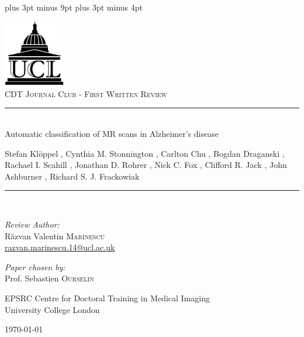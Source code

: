 \documentclass[11pt,a4paper,oneside]{report}
\begin{document}
\belowdisplayskip=12pt plus 3pt minus 9pt
\belowdisplayshortskip=7pt plus 3pt minus 4pt


\begin{titlepage}
\begin{center}

\includegraphics[width=0.2\textwidth]{ucl-logo2}~\\[1cm]


\textsc{\Large CDT Journal Club - First Written Review}\\[0.5cm]

\newcommand{\HRule}{\rule{\linewidth}{0.5mm}}

\HRule \\[0.4cm]
{ \Large Automatic classification of MR scans in Alzheimer's disease \\[0.4cm] }

{ \small Stefan Kl\"{o}ppel , Cynthia M. Stonnington , Carlton Chu , Bogdan Draganski , Rachael I. Scahill , Jonathan D. Rohrer , Nick C. Fox , Clifford R. Jack , John Ashburner , Richard S. J. Frackowiak}

\HRule \\[1.5cm]

\begin{minipage}{0.4\textwidth}
\begin{flushleft} \large
\emph{Review Author:}\\
R\u{a}zvan Valentin \textsc{Marinescu}\\
\href{razvan.marinescu.14@ucl.ac.uk}{razvan.marinescu.14@ucl.ac.uk}\\
\end{flushleft}
\end{minipage}
\begin{minipage}{0.4\textwidth}
\begin{flushright} \large
\emph{Paper chosen by:} \\
Prof. Sebastien \textsc{Ourselin}\\
\end{flushright}
\end{minipage}

\vfill

EPSRC Centre for Doctoral Training in Medical Imaging\\ University College London

\vfill

{\large \today}

\end{center}
\end{titlepage}
\end{document}

